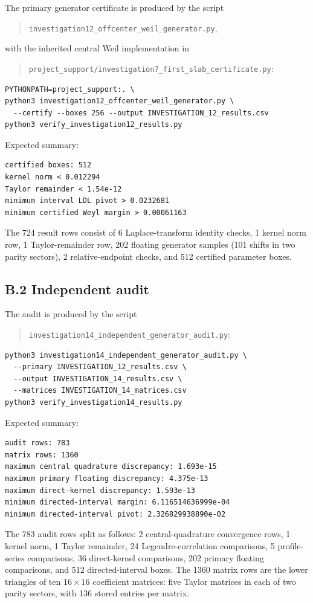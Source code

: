 \documentclass[11pt,a4paper]{article}
\theoremstyle{plain}
\theoremstyle{definition}
\numberwithin{equation}{section}
\begin{document}
The primary generator certificate is produced by the script
\begin{quote}
\texttt{investigation12\_offcenter\_weil\_generator.py},
\end{quote}
with the inherited central Weil implementation in
\begin{quote}
\texttt{project\_support/investigation7\_first\_slab\_certificate.py}:
\end{quote}
\begin{verbatim}
PYTHONPATH=project_support:. \
python3 investigation12_offcenter_weil_generator.py \
  --certify --boxes 256 --output INVESTIGATION_12_results.csv
python3 verify_investigation12_results.py
\end{verbatim}
Expected summary:
\begin{verbatim}
certified boxes: 512
kernel norm < 0.012294
Taylor remainder < 1.54e-12
minimum interval LDL pivot > 0.0232681
minimum certified Weyl margin > 0.00061163
\end{verbatim}
The 724 result rows consist of 6 Laplace-transform identity checks, 1 kernel
norm row, 1 Taylor-remainder row, 202 floating generator samples (101 shifts
in two parity sectors), 2 relative-endpoint checks, and 512 certified
parameter boxes.

\subsection*{B.2 Independent audit}

The audit is produced by the script
\begin{quote}
\texttt{investigation14\_independent\_generator\_audit.py}:
\end{quote}
\begin{verbatim}
python3 investigation14_independent_generator_audit.py \
  --primary INVESTIGATION_12_results.csv \
  --output INVESTIGATION_14_results.csv \
  --matrices INVESTIGATION_14_matrices.csv
python3 verify_investigation14_results.py
\end{verbatim}
Expected summary:
\begin{verbatim}
audit rows: 783
matrix rows: 1360
maximum central quadrature discrepancy: 1.693e-15
maximum primary floating discrepancy: 4.375e-13
maximum direct-kernel discrepancy: 1.593e-13
minimum directed-interval margin: 6.116514636999e-04
minimum directed-interval pivot: 2.326829938890e-02
\end{verbatim}
The 783 audit rows split as follows: 2 central-quadrature convergence rows,
1 kernel norm, 1 Taylor remainder, 24 Legendre-correlation comparisons,
5 profile-series comparisons, 36 direct-kernel comparisons, 202 primary
floating comparisons, and 512 directed-interval boxes. The 1360 matrix rows
are the lower triangles of ten $16\times16$ coefficient matrices: five Taylor
matrices in each of two parity sectors, with 136 stored entries per matrix.
\end{document}
